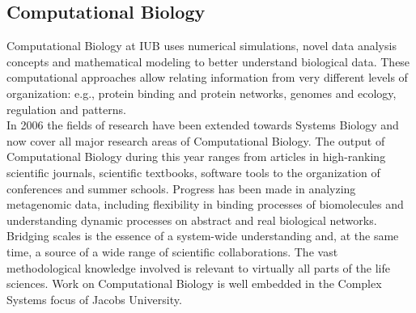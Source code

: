 \subsection{Computational Biology}

Computational Biology at IUB uses numerical simulations, novel data analysis concepts and mathematical modeling to better understand biological data. These computational approaches allow relating information from very different levels of organization: e.g., protein binding and protein networks, genomes and ecology, regulation and patterns.\\

In 2006 the fields of research have been extended towards Systems Biology and now cover all major research areas of Computational Biology. The output of Computational Biology during this year ranges from articles in high-ranking scientific journals, scientific textbooks, software tools to the organization of conferences and summer schools. Progress has been made in analyzing metagenomic data, including flexibility in binding processes of biomolecules and understanding dynamic processes on abstract and real biological networks.\\

Bridging scales is the essence of a system-wide understanding and, at the same time, a source of a wide range of scientific collaborations. The vast methodological knowledge involved is relevant to virtually all parts of the life sciences. Work on Computational Biology is well embedded in the Complex Systems focus of Jacobs University.\\
